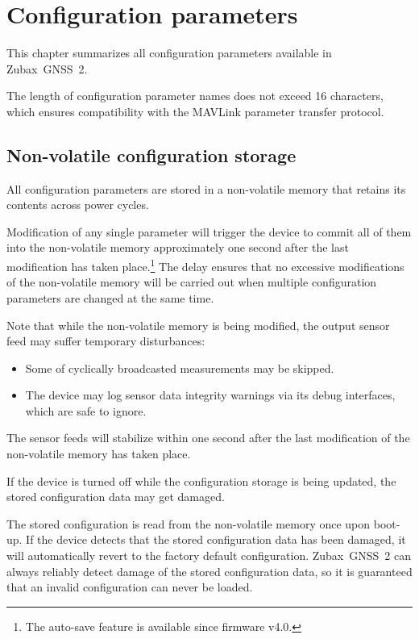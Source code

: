 \documentclass{zubaxdoc}
\begin{document}
%
%

\chapter{Configuration parameters}\label{sec:configuration_parameters}

This chapter summarizes all configuration parameters available in Zubax~GNSS~2.

The length of configuration parameter names does not exceed 16 characters,
which ensures compatibility with the MAVLink parameter transfer protocol.

\section{Non-volatile configuration storage}

All configuration parameters are stored in a non-volatile memory
that retains its contents across power cycles.

Modification of any single parameter will trigger the device to commit all of them into the non-volatile
memory approximately one second after the last modification has taken
place.\footnote{The auto-save feature is available since firmware v4.0.}
The delay ensures that no excessive modifications of the non-volatile memory will be carried out
when multiple configuration parameters are changed at the same time.

Note that while the non-volatile memory is being modified,
the output sensor feed may suffer temporary disturbances:
\begin{itemize}
    \item Some of cyclically broadcasted measurements may be skipped.
    \item The device may log sensor data integrity warnings via its debug interfaces, which are safe to ignore.
\end{itemize}
The sensor feeds will stabilize within one second after the last modification of the
non-volatile memory has taken place.

If the device is turned off while the configuration storage is being updated,
the stored configuration data may get damaged.

The stored configuration is read from the non-volatile memory once upon boot-up.
If the device detects that the stored configuration data has been damaged,
it will automatically revert to the factory default configuration.
Zubax~GNSS~2 can always reliably detect damage of the stored configuration data,
so it is guaranteed that an invalid configuration can never be loaded.
\end{document}
